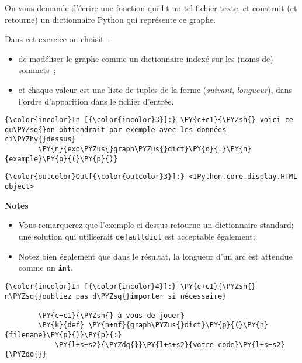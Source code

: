     On vous demande d'écrire une fonction qui lit un tel fichier texte, et
construit (et retourne) un dictionnaire Python qui représente ce graphe.

Dans cet exercice on choisit~:

\begin{itemize}
\tightlist
\item
  de modéliser le graphe comme un dictionnaire indexé sur les (noms de)
  sommets~;
\item
  et chaque valeur est une liste de tuples de la forme (\emph{suivant},
  \emph{longueur}), dans l'ordre d'apparition dans le fichier d'entrée.
\end{itemize}

    \begin{Verbatim}[commandchars=\\\{\}]
{\color{incolor}In [{\color{incolor}3}]:} \PY{c+c1}{\PYZsh{} voici ce qu\PYZsq{}on obtiendrait par exemple avec les données ci\PYZhy{}dessus}
        \PY{n}{exo\PYZus{}graph\PYZus{}dict}\PY{o}{.}\PY{n}{example}\PY{p}{(}\PY{p}{)}
\end{Verbatim}


\begin{Verbatim}[commandchars=\\\{\}]
{\color{outcolor}Out[{\color{outcolor}3}]:} <IPython.core.display.HTML object>
\end{Verbatim}
            
    \textbf{Notes}

\begin{itemize}
\tightlist
\item
  Vous remarquerez que l'exemple ci-dessus retourne un dictionnaire
  standard; une solution qui utiliserait \texttt{defaultdict} est
  acceptable également;
\item
  Notez bien également que dans le résultat, la longueur d'un arc est
  attendue comme un \textbf{\texttt{int}}.
\end{itemize}

    \begin{Verbatim}[commandchars=\\\{\}]
{\color{incolor}In [{\color{incolor}4}]:} \PY{c+c1}{\PYZsh{} n\PYZsq{}oubliez pas d\PYZsq{}importer si nécessaire}
        
        \PY{c+c1}{\PYZsh{} à vous de jouer}
        \PY{k}{def} \PY{n+nf}{graph\PYZus{}dict}\PY{p}{(}\PY{n}{filename}\PY{p}{)}\PY{p}{:}
            \PY{l+s+s2}{\PYZdq{}}\PY{l+s+s2}{votre code}\PY{l+s+s2}{\PYZdq{}}
\end{Verbatim}


